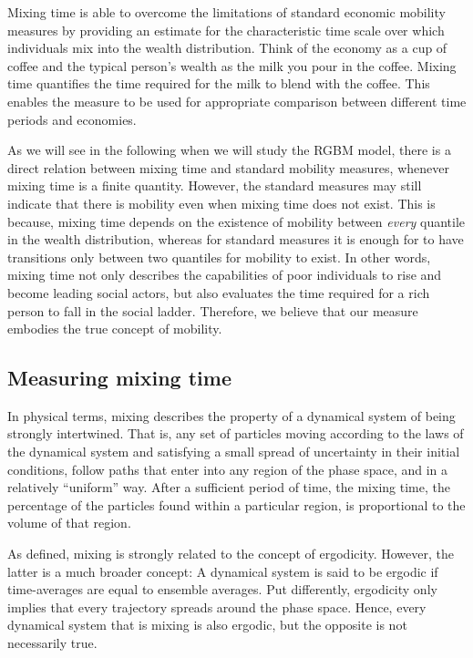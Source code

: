 \documentclass[11pt]{article}
\numberwithin{equation}{section}
\begin{document}
Mixing time is able to overcome the limitations of standard economic mobility measures by providing an estimate for the characteristic time scale over which individuals mix into the wealth distribution. Think of the economy as a cup of coffee and the typical person's wealth as the milk you pour in the coffee. Mixing time quantifies the time required for the milk to blend with the coffee. This enables the measure to be used for appropriate comparison between different time periods and economies.

As we will see in the following when we will study the RGBM model, there is a direct relation between mixing time and standard mobility measures, whenever mixing time is a finite quantity. However, the standard measures may still indicate that there is mobility even when mixing time does not exist. This is because,  mixing time depends on the existence of mobility between \textit{every} quantile in the wealth distribution, whereas for standard measures it is enough for to have transitions only between two quantiles for mobility to exist. In other words, mixing time not only describes the capabilities of poor individuals to rise and become leading social actors, but also evaluates the time required for a rich person to fall in the social ladder. Therefore, we believe that our measure embodies the true concept of mobility.

\subsection{Measuring mixing time}

In physical terms, mixing describes the property of a dynamical system of being strongly intertwined. That is, any set of particles moving according to the laws of the dynamical system and satisfying a small spread of uncertainty in their initial conditions, follow paths that enter into any region of the phase space, and in a relatively ``uniform'' way. After a sufficient period of time, the mixing time, the percentage of the particles found within a particular region, is proportional to the volume of that region. 

As defined, mixing is strongly related to the concept of ergodicity. However, the latter is a much broader concept: A dynamical system is said to be ergodic if time-averages are equal to ensemble averages. Put differently, ergodicity only implies that every trajectory spreads around the phase space. Hence, every dynamical system that is mixing is also ergodic, but the opposite is not necessarily true.
\end{document}
